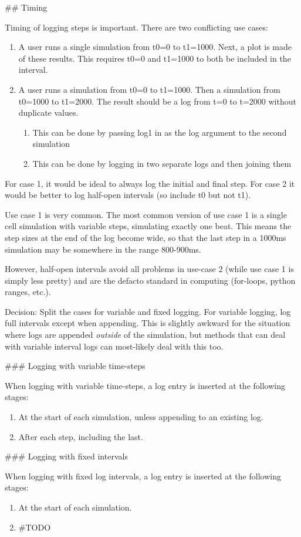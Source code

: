 ## Timing

Timing of logging steps is important. There are two conflicting use
cases:
\begin{enumerate}
\item A user runs a single simulation from t0=0 to t1=1000. Next, a plot
is made of these results. This requires t0=0 and t1=1000 to both be
included in the interval.
\item A user runs a simulation from t0=0 to t1=1000. Then a simulation from
t0=1000 to t1=2000. The result should be a log from t=0 to t=2000
without duplicate values.

\begin{enumerate}
\item This can be done by passing log1 in as the log argument to the second
simulation
\item This can be done by logging in two separate logs and then joining
them
\end{enumerate}
\end{enumerate}
For case 1, it would be ideal to always log the initial and final
step. For case 2 it would be better to log half-open intervals (so
include t0 but not t1).

Use case 1 is very common. The most common version of use case 1 is
a single cell simulation with variable steps, simulating exactly one
beat. This means the step sizes at the end of the log become wide,
so that the last step in a 1000ms simulation may be somewhere in the
range 800-900ms.

However, half-open intervals avoid all problems in use-case 2 (while
use case 1 is simply less pretty) and are the defacto standard in
computing (for-loops, python ranges, etc.).

Decision: Split the cases for variable and fixed logging. For variable
logging, log full intervals except when appending. This is slightly
awkward for the situation where logs are appended \emph{outside} of
the simulation, but methods that can deal with variable interval logs
can most-likely deal with this too.


### Logging with variable time-steps

When logging with variable time-steps, a log entry is inserted at
the following stages:
\begin{enumerate}
\item At the start of each simulation, unless appending to an existing log.
\item After each step, including the last.
\end{enumerate}

### Logging with fixed intervals

When logging with fixed log intervals, a log entry is inserted at
the following stages:
\begin{enumerate}
\item At the start of each simulation.
\item \#TODO
\end{enumerate}

